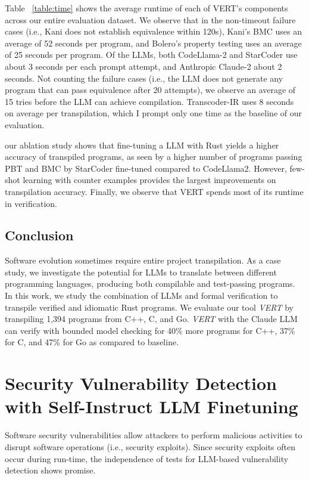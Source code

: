 \documentclass[12pt,openany,oneside,table]{cmuthesis}
\begin{document}
Table ~\ref{table:time} shows the average runtime of each of VERT's
components across our entire evaluation dataset. We observe that in
the non-timeout failure cases (i.e., Kani does not establish
equivalence within 120s), Kani's BMC uses an
average of 52 seconds per program, and Bolero's property testing uses
an average of 25 seconds per program. Of the LLMs, both CodeLlama-2 and StarCoder use about 3 seconds per each prompt attempt, and Anthropic Claude-2 about 2
seconds. Not counting the failure cases (i.e., the LLM does not
generate any program that can pass equivalence after 20 attempts), we
observe an average of 15 tries before the LLM can achieve
compilation. Transcoder-IR uses 8 seconds on average per
transpilation, which I prompt only one time as the baseline of our
evaluation.

\begin{tcolorbox}
[colback=white,colframe=black,arc=0pt,boxrule=0.5pt,title=RQ2 Summary,boxsep=2pt,left=1pt,right=1pt,top=1pt,bottom=1pt,fonttitle=\bfseries]
our ablation study shows that fine-tuning a LLM with Rust yields a higher accuracy of transpiled programs, as seen by a higher number of programs passing PBT and BMC by StarCoder fine-tuned compared to CodeLlama2.
However, few-shot learning with counter examples provides the largest improvements on transpilation accuracy. Finally, we observe that VERT spends most of its runtime in verification.
\end{tcolorbox}


\section{Conclusion}
\label{sec:vert-conclusion}
Software evolution sometimes require entire project transpilation. As a case study, we investigate the potential for LLMs to translate between different programming languages, producing both compilable and test-passing programs. 
In this work, we study the combination of LLMs and formal verification to transpile verified and idiomatic Rust programs. We evaluate our tool \textit{VERT} by transpiling 1,394 programs from C++, C, and Go. \textit{VERT} with the Claude LLM can verify with bounded model checking for 40\% more programs for C++, 37\% for C, and 47\% for Go as compared to baseline.


\chapter{Security Vulnerability Detection with Self-Instruct LLM Finetuning}
\label{ch:msivd}
Software security vulnerabilities allow attackers to perform malicious activities to disrupt software operations (i.e., security exploits). Since security exploits often occur during run-time, the independence of tests for LLM-based vulnerability detection shows promise.
\end{document}
